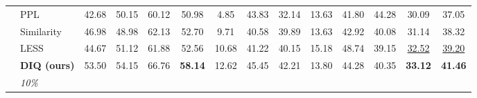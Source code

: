 \documentclass[letterpaper]{article} %
\newcommand{\TableLineColor}{\rowcolor{lightblue}}
\begin{document}
\begin{table}[!t]
\begin{adjustbox}{max width=1.0\textwidth}
\begin{tabular}{llcccccccccccc}
                                                    & PPL                                                & 42.68                             & 50.15                             & 60.12                             & 50.98                                & 4.85                             & 43.83                             & 32.14                             & 13.63                             & 41.80                             & 44.28                             & 30.09                                & 37.05                                \\
                                                    & Similarity                                         & 46.98                             & 48.98                             & 62.13                             & 52.70                                & 9.71                             & 40.58                             & 39.89                             & 13.63                             & 42.92                             & 40.08                             & 31.14                                & 38.32                                \\
                                                    & LESS                                               & 44.67                             & 51.12                             & 61.88                             & 52.56                                & 10.68                            & 41.22                             & 40.15                             & 15.18                             & 48.74                             & 39.15                             & \underline{32.52}                                & \underline{39.20}                                \\
\TableLineColor \cellcolor{white}                   &  \textbf{DIQ (ours)}                                & 53.50                             & 54.15                             & 66.76                             & \textbf{58.14}                       & 12.62                            & 45.45                             & 42.21                             & 13.80                             & 44.28                             & 40.35                             & \textbf{33.12}                       & \textbf{41.46}                       \\ \cmidrule(l){2-14}
                                                    & \textit{10\%}                                      &                                   &                                   &                                   &                                      &                                  &                                   &                                   &                                   &                                   &                                   &                                      &                                      \\

\end{tabular}
\end{adjustbox}
\end{table}
\end{document}
